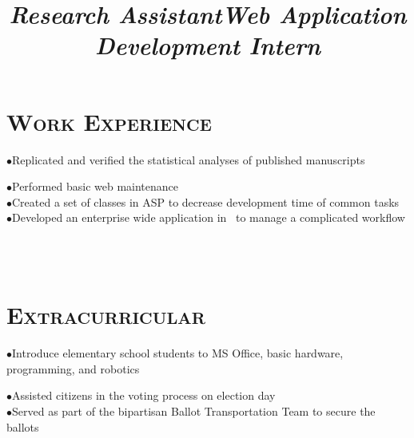 \begin{resume}
\section{\textsc{Work Experience}}

\title{\textit{Research Assistant}}
\begin{position}
$\bullet$Replicated and verified the statistical analyses of published manuscripts
\end{position}


\title{\textit{Web Application Development Intern}}
\begin{position}
$\bullet$Performed basic web maintenance \\
$\bullet$Created a set of classes in ASP to decrease development time of common tasks \\
$\bullet$Developed an enterprise wide application in \CSharp \ to manage a complicated workflow 
\end{position}


\begin{formatb}
  \\
  \body\\
\end{formatb}

\section{\textsc{Extracurricular}}
\begin{position}
$\bullet$Introduce elementary school students to MS Office, basic hardware, programming, and robotics
\end{position}

\begin{position}
$\bullet$Assisted citizens in the voting process on election day \\
$\bullet$Served as part of the bipartisan Ballot Transportation Team to secure the ballots
\end{position}



\end{resume}


